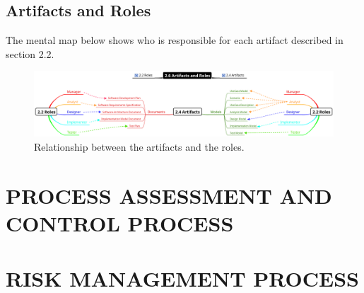 \documentclass[11pt, twoside, a4paper]{book}
\begin{document}
			\begin{landscape}
			
				\section{Artifacts and Roles}

					The mental map below shows who is responsible for each artifact described in section 2.2.

					\begin{figure}[!ht]
						\centering
  						\includegraphics[scale=0.4]{2-6_Artifacts_and_Roles.eps}
						\caption{Relationship between the artifacts  and the roles.}
					\end{figure}  		
				
			\end{landscape}


        \chapter{PROCESS ASSESSMENT AND CONTROL PROCESS}

                
        \chapter{RISK MANAGEMENT PROCESS}

        
\end{document}
